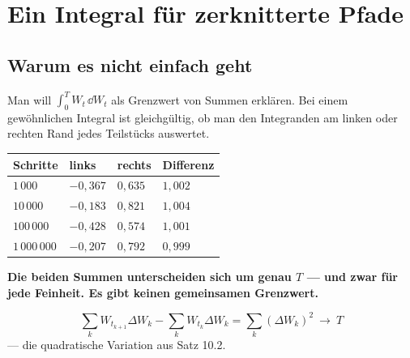 \chapter{Ein Integral für zerknitterte Pfade}

\section{Warum es nicht einfach geht}

\begin{merksatz}
Man will $\int_0^T W_t\,\dd W_t$ als Grenzwert von Summen erklären. Bei einem gewöhnlichen Integral ist gleichgültig, ob man den Integranden am linken oder rechten Rand jedes Teilstücks auswertet.

\begin{center}
{\small
\renewcommand{\arraystretch}{1.48}
\begin{tabular}{@{}P{1.8cm}P{2.0cm}P{2.0cm}P{2.0cm}@{}}
\toprule
\textbf{Schritte} & \textbf{links} & \textbf{rechts} & \textbf{Differenz}\\
\midrule
$1\,000$ & $-0{,}367$ & $0{,}635$ & $1{,}002$\\
$10\,000$ & $-0{,}183$ & $0{,}821$ & $1{,}004$\\
$100\,000$ & $-0{,}428$ & $0{,}574$ & $1{,}001$\\
$1\,000\,000$ & $-0{,}207$ & $0{,}792$ & $0{,}999$\\
\bottomrule
\end{tabular}}
\end{center}

\begin{center}
\begin{minipage}{0.9\textwidth}
\textbf{Die beiden Summen unterscheiden sich um genau $T$ --- und zwar für jede Feinheit. Es gibt keinen gemeinsamen Grenzwert.}
\end{minipage}
\end{center}

\[ \sum_k W_{t_{k+1}}\Delta W_k - \sum_k W_{t_k}\Delta W_k = \sum_k (\Delta W_k)^{2} \ \longrightarrow\ T \]
--- die quadratische Variation aus Satz 10.2.

\begin{center}
\begin{minipage}{0.88\textwidth}
\end{minipage}
\end{center}
\end{merksatz}

